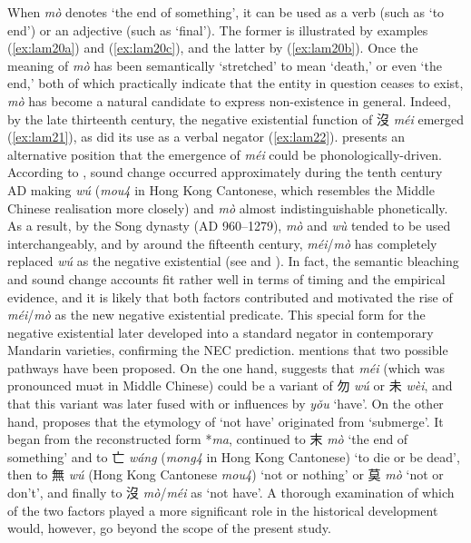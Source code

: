 \documentclass[output=paper]{langscibook}
\begin{document}
When \textit{mò} denotes `the end of something', it can be used as a verb (such as `to end') or an adjective (such as `final'). The former is illustrated by examples (\ref{ex:lam20a}) and (\ref{ex:lam20c}), and the latter by (\ref{ex:lam20b}). Once the meaning of \textit{mò} has been semantically `stretched' to mean `death,' or even `the end,' both of which practically indicate that the entity in question ceases to exist, \textit{mò} has become a natural candidate to express non-existence in general. Indeed, by the late thirteenth century, the negative existential function of 沒 \textit{méi} emerged (\ref{ex:lam21}), as did its use as a verbal negator (\ref{ex:lam22}). \citet{Xu2003} presents an alternative position that the emergence of \textit{méi} could be phonologically-driven. According to \citeauthor{Xu2003}, sound change occurred approximately during the tenth century AD making \textit{wú} (\textit{mou4} in Hong Kong Cantonese, which resembles the Middle Chinese realisation more closely) and \textit{mò} almost indistinguishable phonetically. As a result, by the Song dynasty (AD 960–1279), \textit{mò} and \textit{wù} tended to be used interchangeably, and by around the fifteenth century, \textit{méi}/\textit{mò} has completely replaced \textit{wú} as the negative existential (see \citealt{PanW2002} and \citealt{Xu2003}). In fact, the semantic bleaching and sound change accounts fit rather well in terms of timing and the empirical evidence, and it is likely that both factors contributed and motivated the rise of \textit{méi}/\textit{mò} as the new negative existential predicate. This special form for the negative existential later developed into a standard negator in contemporary Mandarin varieties, confirming the NEC prediction. \citet[376--377, 517--518]{Schuessler2007} mentions that two possible pathways have been proposed. On the one hand, \citet[126]{Norman1988} suggests that \textit{méi} (which was pronounced muət in Middle Chinese) could be a variant of
{\cn 勿} \textit{wú} or
{\cn 未} \textit{wèi}, and that this variant was later fused with or influences by \textit{yǒu} `have'. On the other hand, \citet[121]{Pulleyblank1973} proposes that the etymology of `not have' originated from `submerge'. It began from the reconstructed form *\textit{ma}, continued to
{\cn 末} \textit{mò} `the end of something' and to
{\cn 亡 \textit{wáng}} (\textit{mong4} in Hong Kong Cantonese) `to die or be dead', then to
{\cn 無} \textit{wú} (Hong Kong Cantonese \textit{mou4}) `not or nothing' or
{\cn 莫} \textit{mò} `not or don't', and finally to
{\cn 沒} \textit{mò}/\textit{méi} as `not have'. A thorough examination of which of the two factors played a more significant role in the historical development would, however, go beyond the scope of the present study.
\end{document}

